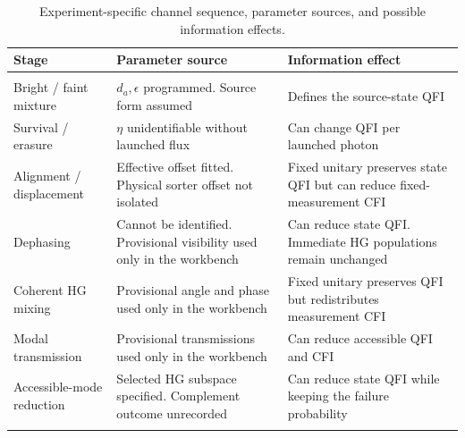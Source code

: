 \begin{table}[htbp]
    \centering
    \caption{Experiment-specific channel sequence, parameter sources, and possible information effects.}
    \label{tab:spade_channel_sequence}
    \begin{tabularx}{\textwidth}{p{3cm} p{5cm} X}
        \toprule
        \rowcolor{gray!5} \textbf{Stage}  & \textbf{Parameter source}                                               & \textbf{Information effect}                                            \\
        \midrule
        \rowcolor{gray!15} \multicolumn{3}{l}{\textbf{Quantum preparation and channels}}                                                                                                     \\
        \midrule
        Bright / \newline faint mixture   & $d_a,\epsilon$ programmed. Source form assumed                          & Defines the source-state QFI                                           \\
        Survival / \newline erasure       & $\eta$ unidentifiable without launched flux                             & Can change QFI per launched photon                                     \\
        Alignment / \newline displacement & Effective offset fitted. Physical sorter offset not isolated            & Fixed unitary preserves state QFI but can reduce fixed-measurement CFI \\
        Dephasing                         & Cannot be identified. Provisional visibility used only in the workbench & Can reduce state QFI. Immediate HG populations remain unchanged        \\
        Coherent HG mixing                & Provisional angle and phase used only in the workbench                  & Fixed unitary preserves QFI but redistributes measurement CFI          \\
        Modal transmission                & Provisional transmissions used only in the workbench                    & Can reduce accessible QFI and CFI                                      \\
        Accessible-mode reduction         & Selected HG subspace specified. Complement outcome unrecorded           & Can reduce state QFI while keeping the failure probability             \\
        \midrule
        \rowcolor{gray!15} \multicolumn{3}{l}{\textbf{Quantum measurement}}                                                                                                                  \\

\end{tabularx}
\end{table}
